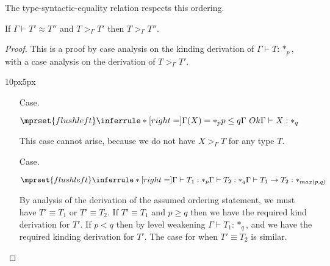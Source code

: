 \noindent
The type-syntactic-equality relation respects this ordering.
\begin{lemma}
  \label{lemma:typeq_ordering_ssfe}
  If $\Gamma \vdash T' \approx T''$ and $T >_{\Gamma} T'$ then $T >_\Gamma T''$.
\end{lemma}
\begin{proof}
  This is a proof by case analysis on the kinding derivation of 
$\Gamma \vdash T:*_p$, with a case analysis on the derivation of 
$T >_\Gamma T'$.\\
\vspace{-25px}
\begin{changemargin}{10px}{5px}\noindent
\begin{itemize}
\item[Case.]\ \\
  \begin{center}
    \begin{math}
      $$\mprset{flushleft}
      \inferrule* [right=] {
        \Gamma(X) = *_p
	\\
	p \leq q
	\\
	\Gamma\ Ok
      }{\Gamma \vdash X : *_q}
    \end{math}
  \end{center}
  This case cannot arise, because we do not have $X >_\Gamma T$ for any type 
  $T$.\\
  
\item[Case.]\ \\
  \begin{center}
    \begin{math}
      $$\mprset{flushleft}
      \inferrule* [right=] {
        \Gamma \vdash T_1 : *_p
	\\
	\Gamma \vdash T_2 : *_q
      }{\Gamma \vdash T_1 \rightarrow T_2 : *_{max(p,q)}}
    \end{math}
  \end{center}
  By analysis of the derivation of the assumed ordering statement, we must have 
  $T' \equiv T_1$ or $T' \equiv T_2$.  If $T' \equiv T_1$ and 
  $p \geq q$ then we have the required kind derivation for $T'$. If $p < q$ then by 
  level weakening $\Gamma \vdash T_1:*_q$, and we have the required kinding 
  derivation for $T'$.  The case for when $T' \equiv T_2$ is similar.\\
  

\end{itemize}
\end{changemargin}
\end{proof}
